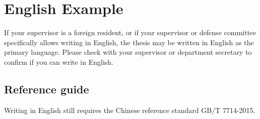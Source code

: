 
\chapter{English Example}

If your supervisor is a foreign resident, or if your supervisor or defense committee specifically allows writing in English, the thesis may be written in English as the primary language. Please check with your supervisor or department secretary to confirm if you can write in English.

\section{Reference guide}

Writing in English still requires the Chinese reference standard GB/T 7714-2015.

